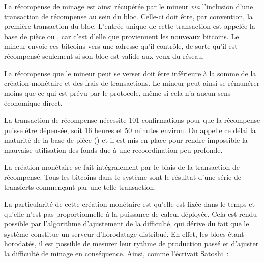La récompense de minage est ainsi récupérée par le mineur \emph{via} l'inclusion d'une transaction de récompense au sein du bloc. Celle-ci doit être, par convention, la première transaction du bloc. L'entrée unique de cette transaction est appelée la base de pièce ou , car c'est d'elle que proviennent les nouveaux bitcoins. Le mineur envoie ces bitcoins vers une adresse qu'il contrôle, de sorte qu'il est récompensé seulement si son bloc est valide aux yeux du réseau.

La récompense que le mineur peut se verser doit être inférieure à la somme de la création monétaire et des frais de transactions. Le mineur peut ainsi se rémunérer moins que ce qui est prévu par le protocole, même si cela n'a aucun sens économique direct.

La transaction de récompense nécessite 101 confirmations pour que la récompense puisse être dépensée, soit 16 heures et 50 minutes environ. On appelle ce délai la maturité de la base de pièce () et il est mis en place pour rendre impossible la mauvaise utilisation des fonds due à une recoordination peu profonde.


La création monétaire se fait intégralement par le biais de la transaction de récompense. Tous les bitcoins dans le système sont le résultat d'une série de transferts commençant par une telle transaction.


La particularité de cette création monétaire est qu'elle est fixée dans le temps et qu'elle n'est pas proportionnelle à la puissance de calcul déployée. Cela est rendu possible par l'algorithme d'ajustement de la difficulté, qui dérive du fait que le système constitue un serveur d'horodatage distribué. En effet, les blocs étant horodatés, il est possible de mesurer leur rythme de production passé et d'ajuster la difficulté de minage en conséquence. Ainsi, comme l'écrivait Satoshi~:

